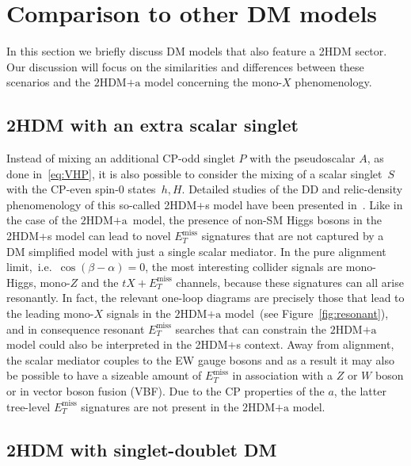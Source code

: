 \documentclass[review]{elsarticle}
\newcommand{\MET}{\ensuremath{E_T^\mathrm{miss}}\xspace}
\newcommand{\hdma}{\ensuremath{\textrm{2HDM+a}}\xspace}
\begin{document}

\section{Comparison to other DM models}
\label{sec:comparison}

In this section we briefly discuss DM models that also feature a 2HDM sector.  Our discussion will focus on the similarities and differences between these scenarios and the \hdma model  concerning the mono-$X$ phenomenology. 

\subsection{2HDM with an extra scalar singlet}
\label{sec:2HDMs}

Instead of mixing an additional CP-odd singlet $P$ with the pseudoscalar $A$, as done in~\eqref{eq:VHP}, it is also possible to consider the mixing of a  scalar singlet~$S$ with  the CP-even spin-0 states~$h,H$. Detailed studies of the DD and relic-density phenomenology of this so-called 2HDM+s model have been presented in~\cite{Bell:2016ekl,Bell:2017rgi}.  Like in the case of the \hdma~model, the presence of  non-SM Higgs bosons in the 2HDM+s model can lead to novel $\MET$ signatures that are not captured by a DM simplified model with just a single scalar mediator. In the pure alignment limit,~i.e.~$\cos ( \beta - \alpha) = 0$, the most interesting collider signals are mono-Higgs, mono-$Z$ and the $t X + \MET$  channels, because  these signatures can all arise resonantly.  In fact, the relevant one-loop diagrams are precisely those that  lead to the leading mono-$X$ signals in the \hdma model~(see Figure~\ref{fig:resonant}), and in consequence resonant $\MET$ searches that can constrain the \hdma model could also be interpreted in the 2HDM+s context. Away from alignment, the scalar mediator couples to the EW gauge bosons and as a result it may also be possible to have a sizeable amount of $\MET$ in association with a $Z$ or $W$ boson or in  vector boson fusion (VBF). Due to the CP properties of the $a$, the latter tree-level $\MET$ signatures are not present in the \hdma model. 

\subsection{2HDM with singlet-doublet DM}
\end{document}

